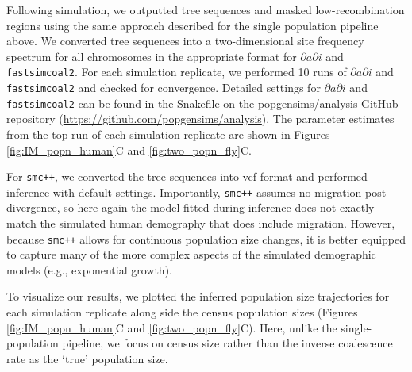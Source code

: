 \documentclass[12pt,halfline,a4paper]{ouparticle}
\newcommand{\dadi}{$\partial a \partial i$\xspace}
\newcommand{\smcpp}{\texttt{smc++}\xspace}
\newcommand{\fastsimcoal}{\texttt{fastsimcoal2}\xspace}
\begin{document}
Following simulation, we outputted tree sequences and masked low-recombination
regions using the same approach described for the single population pipeline above. We
converted tree sequences into a two-dimensional site frequency spectrum for all
chromosomes in the appropriate format for \dadi and \fastsimcoal. For each simulation
replicate, we performed 10 runs of \dadi and \fastsimcoal and checked for convergence.
Detailed settings for \dadi and \fastsimcoal can be found in the Snakefile
on the popgensims/analysis GitHub repository (\url{https://github.com/popgensims/analysis}).
The parameter estimates from the top run of each simulation replicate
are shown in Figures \ref{fig:IM_popn_human}C and \ref{fig:two_popn_fly}C.

For \smcpp, we converted the tree sequences into vcf format and performed inference
with default settings. Importantly, \smcpp assumes no migration post-divergence, so
here again the model fitted during inference does not exactly match the simulated
human demography that does include migration. However, because \smcpp allows
for continuous population size changes, it is better equipped to capture many of the
more complex aspects of the simulated demographic models (e.g., exponential growth).

To visualize our results, we plotted the inferred population size trajectories
for each simulation replicate along side the census population sizes
(Figures \ref{fig:IM_popn_human}C and \ref{fig:two_popn_fly}C). Here, unlike the single-population pipeline,
we focus on census size rather than the inverse coalescence rate as the `true' population size.
\end{document}
